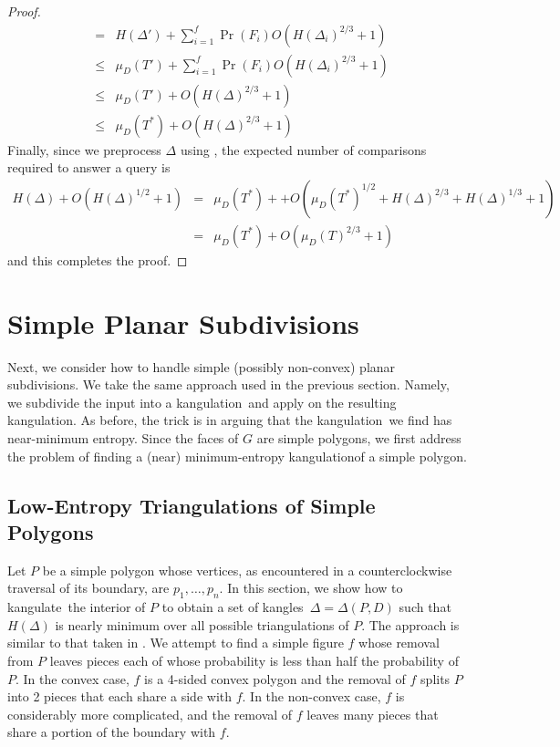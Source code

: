 \documentclass[charterfonts,lotsofwhite]{patmorin}
\newcommand{\kangles}{kangles}
\newcommand{\kangulation}{kangulation}
\newcommand{\kangulate}{kangulate}
\begin{document}
\begin{proof}
\begin{eqnarray*}
    &  =  & H(\Delta') + \sum_{i=1}^f\Pr(F_i) O(H(\Delta_i)^{2/3}+1) \\ 
    & \le & \mu_D(T') + \sum_{i=1}^f\Pr(F_i) O(H(\Delta_i)^{2/3}+1) \\ 
    & \le & \mu_D(T') + O(H(\Delta)^{2/3}+1) \\
    & \le & \mu_D(T^*) + O(H(\Delta)^{2/3}+1)
\end{eqnarray*}
Finally, since we preprocess $\Delta$ using , the
expected number of comparisons required to answer a query is
\begin{eqnarray*}
  H(\Delta) + O(H(\Delta)^{1/2} + 1)
   & = & \mu_D(T^*) + + O(\mu_D(T^*)^{1/2} + H(\Delta)^{2/3} + H(\Delta)^{1/3} + 1) \\
   & = & \mu_D(T^*) + O(\mu_D(T)^{2/3} + 1)
\end{eqnarray*}
and this completes the proof.
\end{proof}

\section{Simple Planar Subdivisions}

Next, we consider how to handle simple (possibly non-convex) planar
subdivisions.  We take the same approach used in the previous section.
Namely, we subdivide the input into a \kangulation\ and apply
  on the resulting \kangulation.  As before, the trick
is in arguing that the \kangulation\ we find has near-minimum entropy.
Since the faces of $G$ are simple polygons, we first address the
problem of finding a (near) minimum-entropy \kangulation of a simple
polygon.

\subsection{Low-Entropy Triangulations of Simple Polygons}

Let $P$ be a simple polygon whose vertices, as encountered in a
counterclockwise traversal of its boundary, are $p_1,\ldots,p_n$.  In
this section, we show how to \kangulate\ the interior of $P$ to obtain
a set of \kangles\ $\Delta=\Delta(P,D)$ such that $H(\Delta)$ is
nearly minimum over all possible triangulations of $P$.  The approach
is similar to that taken in .  We attempt to find a
simple figure $f$ whose removal from $P$ leaves pieces each of whose
probability is less than half the probability of $P$.  In the convex
case, $f$ is a 4-sided convex polygon and the removal of $f$ splits
$P$ into 2 pieces that each share a side with $f$.  In the non-convex
case, $f$ is considerably more complicated, and the removal of $f$
leaves many pieces that share a portion of the boundary with $f$.
\end{document}
